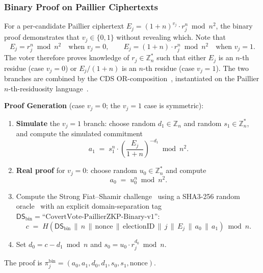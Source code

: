 \subsubsection{Binary Proof on Paillier Ciphertexts}
\label{subsubsec:binary-proof}

For a per-candidate Paillier ciphertext $E_j = (1+n)^{v_j} \cdot r_j^{n} \bmod n^2$, the binary proof demonstrates that $v_j \in \{0,1\}$ without revealing which. Note that
\begin{equation*}
    E_j = r_j^{n} \bmod n^2 \quad \text{when } v_j = 0, \qquad E_j = (1+n) \cdot r_j^{n} \bmod n^2 \quad \text{when } v_j = 1.
\end{equation*}
The voter therefore proves knowledge of $r_j \in \mathbb{Z}_n^*$ such that either $E_j$ is an $n$-th residue (case $v_j = 0$) or $E_j / (1+n)$ is an $n$-th residue (case $v_j = 1$). The two branches are combined by the CDS OR-composition~\cite{cramer1994or}, instantiated on the Paillier $n$-th-residuosity language~\cite{damgard_jurik2001,paillier1999}.

\textbf{Proof Generation} (case $v_j = 0$; the $v_j = 1$ case is symmetric):
\begin{enumerate}
    \item \textbf{Simulate} the $v_j = 1$ branch: choose random $d_1 \in \mathbb{Z}_n$ and random $s_1 \in \mathbb{Z}_n^*$, and compute the simulated commitment
    \begin{equation}
        a_1 \;=\; s_1^{n} \cdot \left(\frac{E_j}{1+n}\right)^{-d_1} \bmod n^2.
    \end{equation}
    \item \textbf{Real proof} for $v_j = 0$: choose random $u_0 \in \mathbb{Z}_n^*$ and compute
    \begin{equation}
        a_0 \;=\; u_0^{n} \bmod n^2.
    \end{equation}
    \item Compute the Strong Fiat--Shamir challenge~\cite{fiat_shamir1986,bernhard2012} using a SHA3-256 random oracle~\cite{nist_fips202} with an explicit domain-separation tag $\mathsf{DS}_{\text{bin}} = \text{``CovertVote-PaillierZKP-Binary-v1''}$:
    \begin{equation}
        c \;=\; H(\mathsf{DS}_{\text{bin}} \,\|\, n \,\|\, \text{nonce} \,\|\, \text{electionID} \,\|\, j \,\|\, E_j \,\|\, a_0 \,\|\, a_1) \bmod n.
        \label{eq:bin-fs}
    \end{equation}
    \item Set $d_0 = c - d_1 \bmod n$ and $s_0 = u_0 \cdot r_j^{d_0} \bmod n$.
\end{enumerate}
The proof is $\pi_j^{\text{bin}} = (a_0, a_1, d_0, d_1, s_0, s_1, \text{nonce})$.


